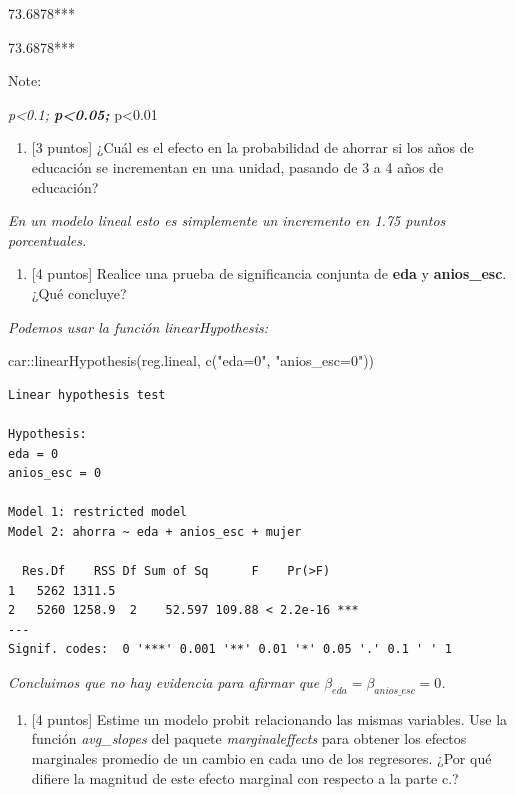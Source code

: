 \documentclass[
  letterpaper,
  DIV=11,
  numbers=noendperiod]{scrartcl}
\newenvironment{Shaded}{\begin{snugshade}}{\end{snugshade}}
\newcommand{\FunctionTok}[1]{\textcolor[rgb]{0.28,0.35,0.67}{#1}}
\newcommand{\NormalTok}[1]{\textcolor[rgb]{0.00,0.23,0.31}{#1}}
\newcommand{\SpecialCharTok}[1]{\textcolor[rgb]{0.37,0.37,0.37}{#1}}
\newcommand{\StringTok}[1]{\textcolor[rgb]{0.13,0.47,0.30}{#1}}
\providecommand{\tightlist}{%
  \setlength{\itemsep}{0pt}\setlength{\parskip}{0pt}}\usepackage{longtable,booktabs,array}
\begin{document}
73.6878***

73.6878***

Note:

\emph{p\textless0.1; \textbf{p\textless0.05; }}p\textless0.01

\begin{enumerate}
\def\labelenumi{\alph{enumi}.}
\tightlist
\item
  {[}3 puntos{]} ¿Cuál es el efecto en la probabilidad de ahorrar si los
  años de educación se incrementan en una unidad, pasando de 3 a 4 años
  de educación?
\end{enumerate}

\emph{En un modelo lineal esto es simplemente un incremento en 1.75
puntos porcentuales.}

\begin{enumerate}
\def\labelenumi{\alph{enumi}.}
\tightlist
\item
  {[}4 puntos{]} Realice una prueba de significancia conjunta de
  \textbf{eda} y \textbf{anios\_esc}. ¿Qué concluye?
\end{enumerate}

\emph{Podemos usar la función linearHypothesis:}

\begin{Shaded}
\begin{Highlighting}[]
\NormalTok{car}\SpecialCharTok{::}\FunctionTok{linearHypothesis}\NormalTok{(reg.lineal, }\FunctionTok{c}\NormalTok{(}\StringTok{"eda=0"}\NormalTok{, }\StringTok{"anios\_esc=0"}\NormalTok{))}
\end{Highlighting}
\end{Shaded}

\begin{verbatim}
Linear hypothesis test

Hypothesis:
eda = 0
anios_esc = 0

Model 1: restricted model
Model 2: ahorra ~ eda + anios_esc + mujer

  Res.Df    RSS Df Sum of Sq      F    Pr(>F)    
1   5262 1311.5                                  
2   5260 1258.9  2    52.597 109.88 < 2.2e-16 ***
---
Signif. codes:  0 '***' 0.001 '**' 0.01 '*' 0.05 '.' 0.1 ' ' 1
\end{verbatim}

\emph{Concluimos que no hay evidencia para afirmar que
\(\beta_{eda}=\beta_{anios\_esc}=0\).}

\begin{enumerate}
\def\labelenumi{\alph{enumi}.}
\tightlist
\item
  {[}4 puntos{]} Estime un modelo probit relacionando las mismas
  variables. Use la función \emph{avg\_slopes} del paquete
  \emph{marginaleffects} para obtener los efectos marginales promedio de
  un cambio en cada uno de los regresores. ¿Por qué difiere la magnitud
  de este efecto marginal con respecto a la parte c.?
\end{enumerate}
\end{document}
